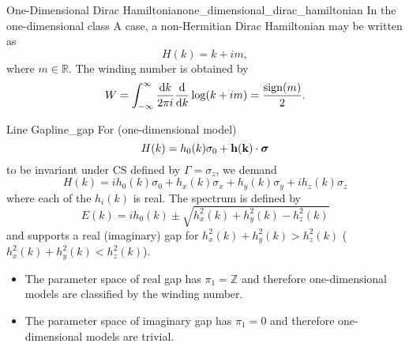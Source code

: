\documentclass{article}
\begin{document}
\begin{example}{One-Dimensional Dirac Hamiltonian}{one_dimensional_dirac_hamiltonian}
    In the one-dimensional class A case, a non-Hermitian Dirac Hamiltonian may be written as
    \[ H(k) = k+im, \]
    where $m\in \mathbb{R}$.
    The winding number is obtained by
    \[ W = \int_{-\infty}^\infty \frac{\dd{k}}{2\pi i} \dv{k} \log(k+im) = \frac{\operatorname{sign}(m)}{2}. \]
\end{example}

\begin{example}{Line Gap}{line_gap}
    For (one-dimensional model)
    \[ H(k) = h_0(k) \sigma_0 + \vb{h}(\vb{k}) \cdot \vb*{\sigma} \]
    to be invariant under $\text{CS}$ defined by $\Gamma = \sigma_z$, we demand
    \[ H(k) = ih_0(k) \sigma_0 + h_x(k) \sigma_x + h_y(k) \sigma_y + ih_z(k) \sigma_z \]
    where each of the $h_i(k)$ is real.
    The spectrum is defined by
    \[ E(k) = ih_0(k) \pm \sqrt{h_x^2(k) + h_y^2(k) - h_z^2(k)} \]
    and supports a real (imaginary) gap for $h_x^2(k) + h_y^2(k) > h_z^2(k)$ ($h_x^2(k) + h_y^2(k) < h_z^2(k)$).
    \begin{itemize}
        \item The parameter space of real gap has $\pi_1 = \mathbb{Z}$ and therefore one-dimensional models are classified by the winding number.
        \item The parameter space of imaginary gap has $\pi_1 = \qty{0}$ and therefore one-dimensional models are trivial.
    \end{itemize}
\end{example}

% 
% 
\end{document}
